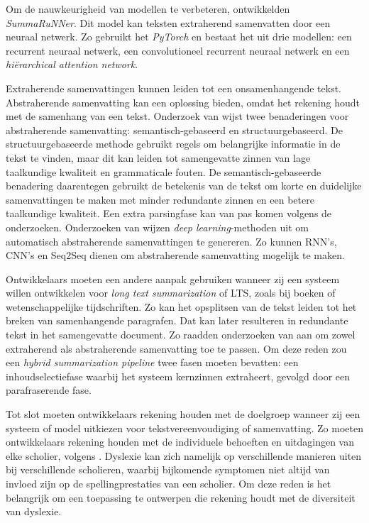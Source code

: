 \medspace

Om de nauwkeurigheid van modellen te verbeteren, ontwikkelden \textcite{Nallapati2017} \textit{SummaRuNNer}. Dit model kan teksten extraherend samenvatten door een neuraal netwerk. Zo gebruikt het \textit{PyTorch} en bestaat het uit drie modellen: een recurrent neuraal netwerk, een convolutioneel recurrent neuraal netwerk en een \textit{hiërarchical attention network}.

\medspace

Extraherende samenvattingen kunnen leiden tot een onsamenhangende tekst. Abstraherende samenvatting kan een oplossing bieden, omdat het rekening houdt met de samenhang van een tekst. Onderzoek van \textcite{Gupta2019} wijst twee benaderingen voor abstraherende samenvatting: semantisch-gebaseerd en structuurgebaseerd. De structuurgebaseerde methode gebruikt regels om belangrijke informatie in de tekst te vinden, maar dit kan leiden tot samengevatte zinnen van lage taalkundige kwaliteit en grammaticale fouten. De semantisch-gebaseerde benadering daarentegen gebruikt de betekenis van de tekst om korte en duidelijke samenvattingen te maken met minder redundante zinnen en een betere taalkundige kwaliteit. Een extra parsingfase kan van pas komen volgens de onderzoeken. Onderzoeken van \textcite{Suleiman2020, Cao2022} wijzen \textit{deep learning}-methoden uit om automatisch abstraherende samenvattingen te genereren. Zo kunnen RNN's, CNN's en Seq2Seq dienen om abstraherende samenvatting mogelijk te maken. 

\medspace

Ontwikkelaars moeten een andere aanpak gebruiken wanneer zij een systeem willen ontwikkelen voor \textit{long text summarization} of LTS, zoals bij boeken of wetenschappelijke tijdschriften. Zo kan het opsplitsen van de tekst leiden tot het breken van samenhangende paragrafen. Dat kan later resulteren in redundante tekst in het samengevatte document. Zo raadden onderzoeken van \textcite{Hsu2018, Huang2019} aan om zowel extraherend als abstraherende samenvatting toe te passen. Om deze reden zou een \textit{hybrid summarization pipeline} twee fasen moeten bevatten: een inhoudselectiefase waarbij het systeem kernzinnen extraheert, gevolgd door een parafraserende fase.

\medspace

Tot slot moeten ontwikkelaars rekening houden met de doelgroep wanneer zij een systeem of model uitkiezen voor tekstvereenvoudiging of samenvatting. Zo moeten ontwikkelaars rekening houden met de individuele behoeften en uitdagingen van elke scholier, volgens \textcite{Gooding2022}. Dyslexie kan zich namelijk op verschillende manieren uiten bij verschillende scholieren, waarbij bijkomende symptomen niet altijd van invloed zijn op de spellingprestaties van een scholier. Om deze reden is het belangrijk om een toepassing te ontwerpen die rekening houdt met de diversiteit van dyslexie.

